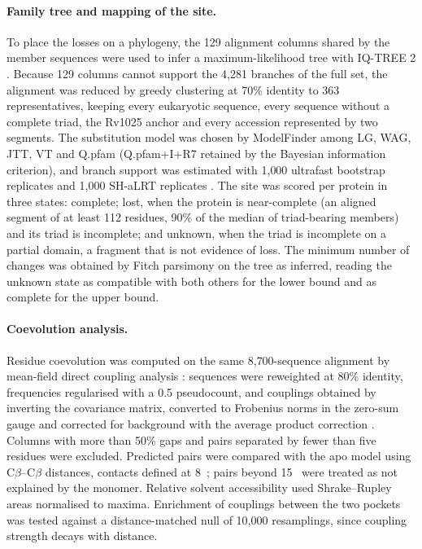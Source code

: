 \documentclass[11pt,a4paper]{article}
\newcommand{\ang}{\text{\AA}}
\begin{document}
\paragraph{Family tree and mapping of the site.} To place the losses on a phylogeny, the 129 alignment columns shared by the member sequences were used to infer a maximum-likelihood tree with IQ-TREE 2 \citep{minh2020iqtree2}. Because 129 columns cannot support the 4{,}281 branches of the full set, the alignment was reduced by greedy clustering at 70\% identity to 363 representatives, keeping every eukaryotic sequence, every sequence without a complete triad, the Rv1025 anchor and every accession represented by two segments. The substitution model was chosen by ModelFinder \citep{kalyaanamoorthy2017modelfinder} among LG, WAG, JTT, VT and Q.pfam \citep{minh2021qmaker} (Q.pfam+I+R7 retained by the Bayesian information criterion), and branch support was estimated with 1{,}000 ultrafast bootstrap replicates \citep{hoang2018ufboot2} and 1{,}000 SH-aLRT replicates \citep{guindon2010phyml}. The site was scored per protein in three states: complete; lost, when the protein is near-complete (an aligned segment of at least 112 residues, 90\% of the median of triad-bearing members) and its triad is incomplete; and unknown, when the triad is incomplete on a partial domain, a fragment that is not evidence of loss. The minimum number of changes was obtained by Fitch parsimony \citep{fitch1971parsimony} on the tree as inferred, reading the unknown state as compatible with both others for the lower bound and as complete for the upper bound.

\paragraph{Coevolution analysis.} Residue coevolution was computed on the same 8{,}700-sequence alignment by mean-field direct coupling analysis \citep{morcos2011dca}: sequences were reweighted at 80\% identity, frequencies regularised with a 0.5 pseudocount, and couplings obtained by inverting the covariance matrix, converted to Frobenius norms in the zero-sum gauge and corrected for background with the average product correction \citep{dunn2008apc}. Columns with more than 50\% gaps and pairs separated by fewer than five residues were excluded. Predicted pairs were compared with the apo model using C$\beta$--C$\beta$ distances, contacts defined at 8~\ang{}; pairs beyond 15~\ang{} were treated as not explained by the monomer. Relative solvent accessibility used Shrake--Rupley areas normalised to \citet{tien2013maxasa} maxima. Enrichment of couplings between the two pockets was tested against a distance-matched null of 10{,}000 resamplings, since coupling strength decays with distance.
\end{document}
